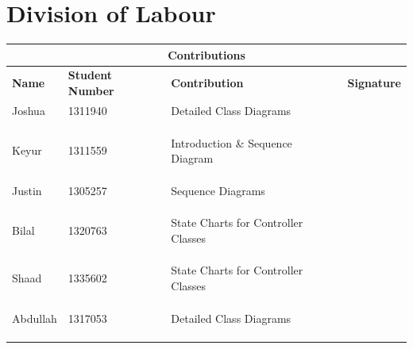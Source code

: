 \documentclass[]{article}
\begin{document}
\section{Division of Labour}
\label{sec:division_of_labour}
\begin{tabular}{ |p{3cm}||p{2cm}|p{6cm}|p{1.5cm}|  }
 \hline
 \multicolumn{4}{|c|}{Contributions} \\
 \hline
 \textbf{Name}& \textbf{Student Number}& \textbf{Contribution}& \textbf{Signature}\\
 \hline
 Joshua & 1311940 & Detailed Class Diagrams &   \\ 
 &&&   \\
 &&&   \\
 &&&   \\
 \hline
 Keyur  & 1311559   & Introduction \& Sequence Diagram  &\\
 &&&   \\
 &&&   \\
 &&&   \\
 \hline
 Justin & 1305257 & Sequence Diagrams & \\
 &&&   \\
 &&&   \\
 &&&   \\
 \hline
 Bilal & 1320763 & State Charts for Controller Classes & \\
 &&&   \\
 &&&   \\
 &&&   \\
 \hline
 Shaad & 1335602 & State Charts for Controller Classes &\\
 &&&   \\
 &&&   \\
 &&&   \\
 \hline
 Abdullah & 1317053 & Detailed Class Diagrams &\\
 &&&   \\
 &&&   \\
 &&&   \\
 \hline
\end{tabular}

\newpage
\end{document}
